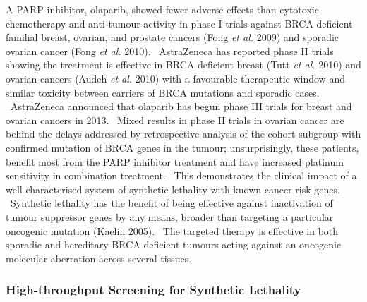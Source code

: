 A PARP inhibitor, olaparib, showed fewer adverse effects than cytotoxic chemotherapy and anti-tumour activity in phase I trials against BRCA deficient familial breast, ovarian, and prostate cancers (Fong\textit{ et al.} 2009) and sporadic ovarian cancer (Fong\textit{ et al.} 2010). \ AstraZeneca has reported phase II trials showing the treatment is effective in BRCA deficient breast (Tutt\textit{ et al.} 2010) and ovarian cancers (Audeh\textit{ et al.} 2010) with a favourable therapeutic window and similar toxicity between carriers of BRCA mutations and sporadic cases. \ AstraZeneca announced that olaparib has begun phase III trials for breast and ovarian cancers in 2013. \ Mixed results in phase II trials in ovarian cancer are behind the delays addressed by retrospective analysis of the cohort subgroup with confirmed mutation of BRCA genes in the tumour; unsurprisingly, these patients, benefit most from the PARP inhibitor treatment and have increased platinum sensitivity in combination treatment. \ This demonstrates the clinical impact of a well characterised system of synthetic lethality with known cancer risk genes. \ Synthetic lethality has the benefit of being effective against inactivation of tumour suppressor genes by any means, broader than targeting a particular oncogenic mutation (Kaelin 2005). \ The targeted therapy is effective in both sporadic and hereditary BRCA deficient tumours acting against an oncogenic molecular aberration across several tissues. \  

\subsubsection[High{}-throughput Screening for Synthetic Lethality]{High-throughput Screening for Synthetic Lethality}


